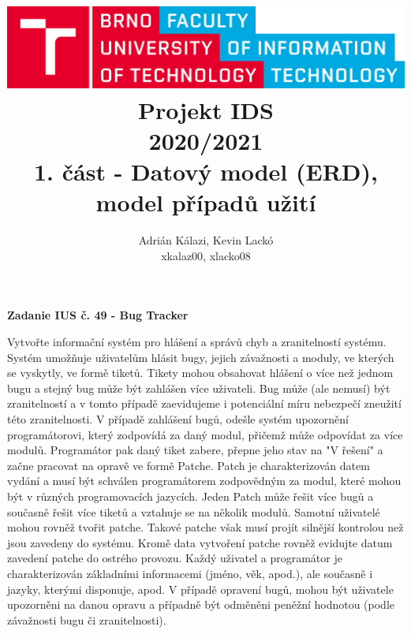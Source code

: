 \documentclass[11pt, a4paper]{article}
\title{\includegraphics[width=0.4\linewidth]{logo_en.png}\vspace{1cm}\\\huge{Projekt IDS\\2020/2021}\\\vspace{1cm}1. část - Datový model (ERD), model případů užití}
\author{Adrián Kálazi, Kevin Lackó\\xkalaz00, xlacko08}
\date{}
\begin{document}
	
	\maketitle

	\bigskip

	\begin{center}
		\textbf{\Large{Zadanie IUS č. 49 - Bug Tracker}}
	\end{center}

	Vytvořte informační systém pro hlášení a správů chyb a zranitelností systému.
	Systém umožňuje uživatelům hlásit bugy, jejich závažnosti a moduly, ve kterých se vyskytly, ve formě tiketů.
	Tikety mohou obsahovat hlášení o více než jednom bugu a stejný bug může být zahlášen více uživateli.
	Bug může (ale nemusí) být zranitelností a v tomto případě zaevidujeme i potenciální míru nebezpečí zneužití této zranitelnosti.
	V případě zahlášení bugů, odešle systém upozornění programátorovi, který zodpovídá za daný modul, přičemž může odpovídat za více modulů.
	Programátor pak daný tiket zabere, přepne jeho stav na "V řešení" a začne pracovat na opravě ve formě Patche.
	Patch je charakterizován datem vydání a musí být schválen programátorem zodpovědným za modul, které mohou být v různých programovacích jazycích.
	Jeden Patch může řešit více bugů a současně řešit více tiketů a vztahuje se na několik modulů.
	Samotní uživatelé mohou rovněž tvořit patche.
	Takové patche však musí projít silnější kontrolou než jsou zavedeny do systému.
	Kromě data vytvoření patche rovněž evidujte datum zavedení patche do ostrého provozu.
	Každý uživatel a programátor je charakterizován základními informacemi (jméno, věk, apod.), ale současně i jazyky, kterými disponuje, apod.
	V případě opravení bugů, mohou být uživatele upozorněni na danou opravu a případně být odměněni peněžní hodnotou (podle závažnosti bugu či zranitelnosti).


	\newpage
\end{document}
